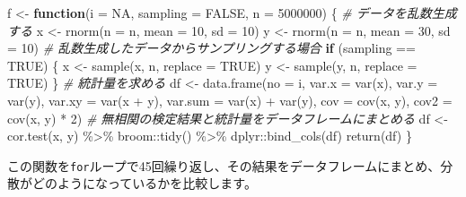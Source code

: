 \documentclass[a4paper]{tufte-handout}
\newenvironment{Shaded}{}{}
\newcommand{\AttributeTok}[1]{\textcolor[rgb]{0.49,0.56,0.16}{#1}}
\newcommand{\CommentTok}[1]{\textcolor[rgb]{0.38,0.63,0.69}{\textit{#1}}}
\newcommand{\ConstantTok}[1]{\textcolor[rgb]{0.53,0.00,0.00}{#1}}
\newcommand{\ControlFlowTok}[1]{\textcolor[rgb]{0.00,0.44,0.13}{\textbf{#1}}}
\newcommand{\DecValTok}[1]{\textcolor[rgb]{0.25,0.63,0.44}{#1}}
\newcommand{\FunctionTok}[1]{\textcolor[rgb]{0.02,0.16,0.49}{#1}}
\newcommand{\NormalTok}[1]{#1}
\newcommand{\OtherTok}[1]{\textcolor[rgb]{0.00,0.44,0.13}{#1}}
\newcommand{\SpecialCharTok}[1]{\textcolor[rgb]{0.25,0.44,0.63}{#1}}
\begin{document}
\begin{Shaded}
\begin{Highlighting}[numbers=left,,]
\NormalTok{f }\OtherTok{\textless{}{-}} \ControlFlowTok{function}\NormalTok{(}\AttributeTok{i =} \ConstantTok{NA}\NormalTok{, }\AttributeTok{sampling =} \ConstantTok{FALSE}\NormalTok{, }\AttributeTok{n =} \DecValTok{5000000}\NormalTok{) \{}
  \CommentTok{\# データを乱数生成する}
\NormalTok{  x }\OtherTok{\textless{}{-}} \FunctionTok{rnorm}\NormalTok{(}\AttributeTok{n =}\NormalTok{ n, }\AttributeTok{mean =} \DecValTok{10}\NormalTok{, }\AttributeTok{sd =} \DecValTok{10}\NormalTok{)}
\NormalTok{  y }\OtherTok{\textless{}{-}} \FunctionTok{rnorm}\NormalTok{(}\AttributeTok{n =}\NormalTok{ n, }\AttributeTok{mean =} \DecValTok{30}\NormalTok{, }\AttributeTok{sd =} \DecValTok{10}\NormalTok{)}
  \CommentTok{\# 乱数生成したデータからサンプリングする場合}
  \ControlFlowTok{if}\NormalTok{ (sampling }\SpecialCharTok{==} \ConstantTok{TRUE}\NormalTok{) \{}
\NormalTok{    x }\OtherTok{\textless{}{-}} \FunctionTok{sample}\NormalTok{(x, n, }\AttributeTok{replace =} \ConstantTok{TRUE}\NormalTok{)}
\NormalTok{    y }\OtherTok{\textless{}{-}} \FunctionTok{sample}\NormalTok{(y, n, }\AttributeTok{replace =} \ConstantTok{TRUE}\NormalTok{)}
\NormalTok{  \}}
  \CommentTok{\# 統計量を求める}
\NormalTok{  df }\OtherTok{\textless{}{-}} \FunctionTok{data.frame}\NormalTok{(}\AttributeTok{no =}\NormalTok{ i, }\AttributeTok{var.x =} \FunctionTok{var}\NormalTok{(x), }\AttributeTok{var.y =} \FunctionTok{var}\NormalTok{(y),}
                   \AttributeTok{var.xy =} \FunctionTok{var}\NormalTok{(x }\SpecialCharTok{+}\NormalTok{ y), }\AttributeTok{var.sum =} \FunctionTok{var}\NormalTok{(x) }\SpecialCharTok{+} \FunctionTok{var}\NormalTok{(y),}
                   \AttributeTok{cov =} \FunctionTok{cov}\NormalTok{(x, y), }\AttributeTok{cov2 =} \FunctionTok{cov}\NormalTok{(x, y) }\SpecialCharTok{*} \DecValTok{2}\NormalTok{)}
  \CommentTok{\# 無相関の検定結果と統計量をデータフレームにまとめる}
\NormalTok{  df }\OtherTok{\textless{}{-}} \FunctionTok{cor.test}\NormalTok{(x, y) }\SpecialCharTok{\%\textgreater{}\%}\NormalTok{ broom}\SpecialCharTok{::}\FunctionTok{tidy}\NormalTok{() }\SpecialCharTok{\%\textgreater{}\%}\NormalTok{ dplyr}\SpecialCharTok{::}\FunctionTok{bind\_cols}\NormalTok{(df)}
  \FunctionTok{return}\NormalTok{(df)}
\NormalTok{\}}
\end{Highlighting}
\end{Shaded}

この関数を\texttt{for}ループで45回繰り返し、その結果をデータフレームにまとめ、分散がどのようになっているかを比較します。
\end{document}
